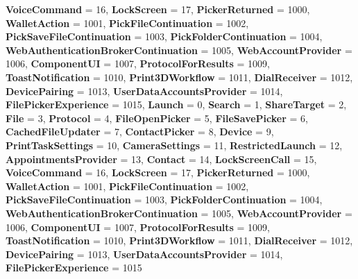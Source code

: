 \begin{DoxyCompactItemize}
{\bfseries Voice\+Command} = 16, 
\newline
{\bfseries Lock\+Screen} = 17, 
{\bfseries Picker\+Returned} = 1000, 
{\bfseries Wallet\+Action} = 1001, 
{\bfseries Pick\+File\+Continuation} = 1002, 
\newline
{\bfseries Pick\+Save\+File\+Continuation} = 1003, 
{\bfseries Pick\+Folder\+Continuation} = 1004, 
{\bfseries Web\+Authentication\+Broker\+Continuation} = 1005, 
{\bfseries Web\+Account\+Provider} = 1006, 
\newline
{\bfseries Component\+UI} = 1007, 
{\bfseries Protocol\+For\+Results} = 1009, 
{\bfseries Toast\+Notification} = 1010, 
{\bfseries Print3\+D\+Workflow} = 1011, 
\newline
{\bfseries Dial\+Receiver} = 1012, 
{\bfseries Device\+Pairing} = 1013, 
{\bfseries User\+Data\+Accounts\+Provider} = 1014, 
{\bfseries File\+Picker\+Experience} = 1015, 
\newline
{\bfseries Launch} = 0, 
{\bfseries Search} = 1, 
{\bfseries Share\+Target} = 2, 
{\bfseries File} = 3, 
\newline
{\bfseries Protocol} = 4, 
{\bfseries File\+Open\+Picker} = 5, 
{\bfseries File\+Save\+Picker} = 6, 
{\bfseries Cached\+File\+Updater} = 7, 
\newline
{\bfseries Contact\+Picker} = 8, 
{\bfseries Device} = 9, 
{\bfseries Print\+Task\+Settings} = 10, 
{\bfseries Camera\+Settings} = 11, 
\newline
{\bfseries Restricted\+Launch} = 12, 
{\bfseries Appointments\+Provider} = 13, 
{\bfseries Contact} = 14, 
{\bfseries Lock\+Screen\+Call} = 15, 
\newline
{\bfseries Voice\+Command} = 16, 
{\bfseries Lock\+Screen} = 17, 
{\bfseries Picker\+Returned} = 1000, 
{\bfseries Wallet\+Action} = 1001, 
\newline
{\bfseries Pick\+File\+Continuation} = 1002, 
{\bfseries Pick\+Save\+File\+Continuation} = 1003, 
{\bfseries Pick\+Folder\+Continuation} = 1004, 
{\bfseries Web\+Authentication\+Broker\+Continuation} = 1005, 
\newline
{\bfseries Web\+Account\+Provider} = 1006, 
{\bfseries Component\+UI} = 1007, 
{\bfseries Protocol\+For\+Results} = 1009, 
{\bfseries Toast\+Notification} = 1010, 
\newline
{\bfseries Print3\+D\+Workflow} = 1011, 
{\bfseries Dial\+Receiver} = 1012, 
{\bfseries Device\+Pairing} = 1013, 
{\bfseries User\+Data\+Accounts\+Provider} = 1014, 
\newline
{\bfseries File\+Picker\+Experience} = 1015

\end{DoxyCompactItemize}
